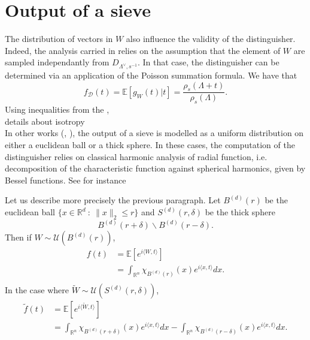 \documentclass{article}
\newcommand{\D}{\mathcal{D}}
\begin{document}
\section{Output of a sieve}  %
\label{section : Sieve}		%

The distribution of vectors in $W$ also influence the validity of the distinguisher. Indeed, the analysis carried in \cite{pouly2023provable} relies on the assumption that the element of $W$ are sampled independantly from $D_{\Lambda^\vee ,s^{-1}}$. In that case, the distinguisher can be determined via an application of the Poisson summation formula. We have that 
\[f_\D(t) = \mathbb E[g_W(t)|t ] = \frac{\rho_s(\Lambda + t)}{\rho_s(\Lambda)}.\] 
Using inequalities from the ,\\

details about isotropy \\

In other works (\cite{carrier2024reduction}, \cite{ducas2023accurate}), the output of a sieve is modelled as a uniform distribution on either a euclidean ball or a thick sphere. In these cases, the computation of the distinguisher relies on classical harmonic analysis of radial function, i.e. decomposition of the characteristic function against spherical harmonics, given by Bessel functions. See for instance %

Let us describe more precisely the previous paragraph. Let $B^{(d)}(r)$ be the euclidean ball $\{x\in\mathbb R^d \ : \  \|x\|_2\leq r\}$ and $S^{(d)}(r,\delta)$ be the thick sphere 
\[ B^{(d)}(r+\delta) \backslash B^{(d)}(r-\delta).\] 
Then if $W\sim\mathcal U(B^{(d)}(r))$,
\[\begin{split}
f(t) & = \mathbb E[e^{i\langle W, t\rangle}] \\
	& = \int_{\mathbb R^n} \chi_{B^{(d)}(r)}(x) e^{i\langle x, t\rangle}dx . \\
\end{split}\]
In the case where $\tilde W\sim\mathcal U(S^{(d)}(r,\delta))$, 
\[\begin{split}
\tilde f(t)  & = \mathbb E[e^{i\langle \tilde W, t\rangle}]\\
	& =  \int_{\mathbb R^n} \chi_{B^{(d)}(r+\delta)}(x) e^{i\langle x, t\rangle}dx - \int_{\mathbb R^n} \chi_{B^{(d)}(r-\delta)}(x) e^{i\langle x, t\rangle}dx. \\
\end{split}\]
\end{document}
